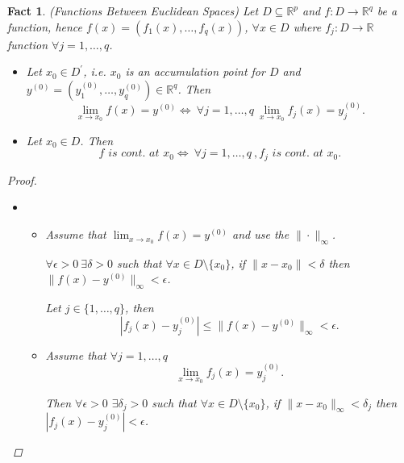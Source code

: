 \documentclass[12pt]{amsbook}
\newtheorem{fact}[theorem]{Fact}
\theoremstyle{definition}
\newcommand{\RR}{{\mathbb R}}
\newcommand{\Ra}{\Rightarrow} %
\newcommand{\La}{\Leftarrow} %
\newcommand{\Lra}{\Leftrightarrow} %
\newcommand{\ra}{\rightarrow} %
\begin{document}
\begin{fact}
\item[(6)] (Functions Between Euclidean Spaces) Let $D \subseteq \RR^p$ and $f: D \ra \RR^q$ be a function, hence $f(x) = \left(f_1(x), \ldots, f_q(x)\right)$, $\forall x \in D$ where  $f_j : D \ra \RR$ function $\forall j = 1, \ldots, q$.
    \begin{itemize}
    \item[(i)] Let $x_0 \in D^\prime$, i.e. $x_0$ is an accumulation point for $D$ and \\ $y^{(0)} = \left(y^{(0)}_1, \ldots, y^{(0)}_q\right) \in \RR^q$. Then
    \begin{equation*}
    \lim_{x \ra x_0} f(x) = y^{(0)} \Lra \ \forall j = 1, \ldots, q \  \lim_{x \ra x_0} f_j(x) = y^{(0)}_j.
    \end{equation*}
    \item[(ii)] Let $x_0 \in D$. Then
    \begin{equation*}
    f \textit{ is cont. at } x_0 \Lra \ \forall j = 1, \ldots, q \ , f_j \textit{ is cont. at } x_0.
    \end{equation*}
    \end{itemize}
    
    \begin{proof} \
    \begin{itemize}
    \item[(i)] \
    	\begin{itemize}
	\item["$\Ra$".] Assume that $\lim_{x \ra x_0} f(x) = y^{(0)}$ and use the $\|\cdot\|_\infty$.
	
	$\forall \epsilon > 0 \ \exists \delta > 0$ such that $\forall x \in D \setminus \{x_0\}$, if $\|x - x_0\| < \delta$ then $\|f(x) - y^{(0)}\|_\infty < \epsilon$.
	
	Let $j \in \{1, \ldots, q\}$, then \begin{equation*} |f_j(x) - y^{(0)}_j| \leq \|f(x) - y^{(0)}\|_\infty < \epsilon. \end{equation*}
	
	\item["$\La$".] Assume that $\forall j = 1, \ldots, q$ \begin{equation*} \lim_{x \ra x_0} f_j(x) = y^{(0)}_j. \end{equation*}
	
	Then $\forall \epsilon > 0$ $\exists \delta_j > 0$ such that $\forall x \in D \setminus \{x_0\}$, if $\|x-x_0\|_\infty < \delta_j$ then $|f_j(x) - y^{(0)}_j| < \epsilon$. 
	

\end{itemize}
\end{itemize}
\end{proof}
\end{fact}
\end{document}

